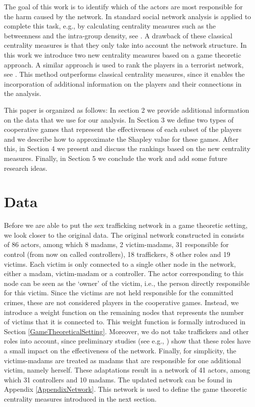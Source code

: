 \documentclass[10p]{article}
\theoremstyle{definition}
\theoremstyle{definition}
\begin{document}
The goal of this work is to identify which of the actors are most responsible for the harm caused by the network. In \cite{mancuso2014not} standard social network analysis is applied to complete this task, e.g., by calculating centrality measures such as the betweenness and the intra-group density, see \cite{wasserman1994social}. A drawback of these classical centrality measures is that they only take into account the network structure. In this work we introduce two new centrality measures based on a game theoretic approach. A similar approach is used to rank the players in a terrorist network, see \cite{lindelauf2011game, husslage2015ranking, campen2018new}. This method outperforms classical centrality measures, since it enables the incorporation of additional information on the players and their connections in the analysis.

This paper is organized as follows: In section 2 we provide additional information on the data that we use for our analysis. In Section 3 we define two types of cooperative games that represent the effectiveness of each subset of the players and we describe how to approximate the Shapley value for these games. After this, in Section 4 we present and discuss the rankings based on the new centrality measures. Finally, in Section 5 we conclude the work and add some future research ideas.

\section{Data}
Before we are able to put the sex trafficking network in a game theoretic setting, we look closer to the original data. The original network constructed in \cite{mancuso2014not} consists of 86 actors, among which 8 madams, 2 victim-madams, 31 responsible for control (from now on called controllers), 18 traffickers, 8 other roles and 19 victims. Each victim is only connected to a single other node in the network, either a madam, victim-madam or a controller. The actor corresponding to this node can be seen as the `owner' of the victim, i.e., the person directly responsible for this victim. Since the victims are not held responsible for the committed crimes, these are not considered players in the cooperative games. Instead, we introduce a weight function on the remaining nodes that represents the number of victims that it is connected to. This weight function is formally introduced in Section \ref{GameTheoreticalSetting}. Moreover, we do not take traffickers and other roles into account, since preliminary studies (see e.g., \cite{mancuso2014not}) show that these roles have a small impact on the effectiveness of the network. Finally, for simplicity, the victims-madams are treated as madams that are responsible for one additional victim, namely herself. These adaptations result in a network of 41 actors, among which 31 controllers and 10 madams. The updated network can be found in Appendix \ref{AppendixNetwork}. This network is used to define the game theoretic centrality measures introduced in the next section.
\end{document}
